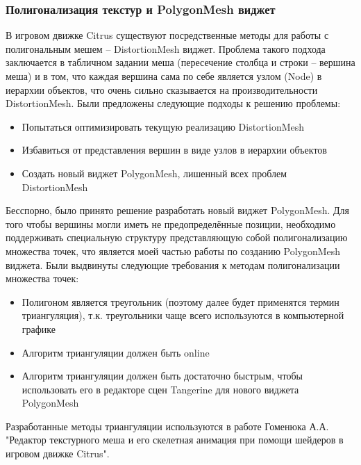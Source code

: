 \documentclass{fefu}
\begin{document}
\subsubsection{Полигонализация текстур и PolygonMesh виджет}
В игровом движке Citrus существуют посредственные методы для работы с полигональным мешем -- 
DistortionMesh виджет. Проблема такого подхода заключается в табличном задании меша (пересечение столбца и строки -- 
вершина меша) и в том, что каждая вершина сама по себе является узлом (Node) в иерархии объектов, что очень сильно сказывается на 
производительности DistortionMesh. Были предложены следующие подходы к решению проблемы:
\begin{itemize}
    \item Попытаться оптимизировать текущую реализацию DistortionMesh
    \item Избавиться от представления вершин в виде узлов в иерархии объектов
    \item Создать новый виджет PolygonMesh, лишенный всех проблем DistortionMesh
\end{itemize}
Бесспорно, было принято решение разработать новый виджет PolygonMesh. Для того чтобы вершины могли 
иметь не предопределённые позиции, необходимо поддерживать специальную структуру представляющую собой 
полигонализацию множества точек, что является моей частью работы по созданию PolygonMesh виджета. Были выдвинуты 
следующие требования к методам полигонализации множества точек: 
\begin{itemize}
    \item Полигоном является треугольник (поэтому далее будет применятся термин триангуляция), т.к. 
треугольники чаще всего используются в компьютерной графике
    \item Алгоритм триангуляции должен быть online
    \item Алгоритм триангуляции должен быть достаточно быстрым, чтобы использовать его в редакторе сцен 
    Tangerine для нового виджета PolygonMesh
\end{itemize}
Разработанные методы триангуляции используются в работе Гоменюка А.А. "Редактор текстурного меша и его скелетная анимация 
при помощи шейдеров в игровом движке Citrus".
\end{document}
